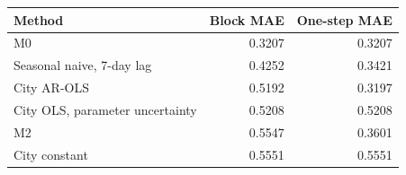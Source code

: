 \begin{tabular}{lrr}
\toprule
Method & Block MAE & One-step MAE \\
\midrule
M0 & 0.3207 & 0.3207 \\
Seasonal naive, 7-day lag & 0.4252 & 0.3421 \\
City AR-OLS & 0.5192 & 0.3197 \\
City OLS, parameter uncertainty & 0.5208 & 0.5208 \\
M2 & 0.5547 & 0.3601 \\
City constant & 0.5551 & 0.5551 \\
\bottomrule
\end{tabular}
